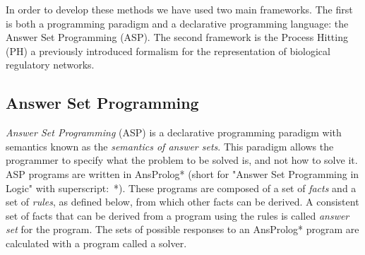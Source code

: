 In order to develop these methods we have used two main frameworks. The first is both a programming paradigm and a declarative programming language: the Answer Set Programming (ASP).
The second framework is the Process Hitting (PH) a previously introduced formalism for the representation of biological regulatory networks.

\subsection{Answer Set Programming }

\emph{Answer Set Programming} (ASP) is a declarative programming paradigm with semantics known as the \emph{semantics of answer sets}.
This paradigm allows the programmer to specify what the problem to be solved is, and not how to solve it.
ASP programs are written in AnsProlog* \cite{sureshkumar2006ansprolog} (short for "Answer Set Programming in Logic" with superscript:~*).
These programs are composed of a set of \emph{facts} and a set of \emph{rules}, as defined below, from which other facts can be derived.
A consistent set of facts that can be derived from a program using the rules is called \emph{answer set} for the program.
The sets of possible responses to an AnsProlog* program are calculated with a program called a solver.

